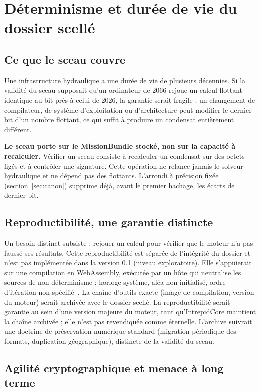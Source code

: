 \documentclass[11pt,a4paper]{article}
\begin{document}
\section{Déterminisme et durée de vie du dossier scellé}\label{sec:determinisme}

\subsection{Ce que le sceau couvre}

Une infrastructure hydraulique a une durée de vie de plusieurs décennies. Si la validité du sceau supposait qu'un ordinateur de 2066 rejoue un calcul flottant identique au bit près à celui de 2026, la garantie serait fragile : un changement de compilateur, de système d'exploitation ou d'architecture peut modifier le dernier bit d'un nombre flottant, ce qui suffit à produire un condensat entièrement différent.

\textbf{Le sceau porte sur le MissionBundle stocké, non sur la capacité à recalculer.} Vérifier un sceau consiste à recalculer un condensat sur des octets figés et à contrôler une signature. Cette opération ne relance jamais le solveur hydraulique et ne dépend pas des flottants. L'arrondi à précision fixée (section~\ref{sec:canon}) supprime déjà, avant le premier hachage, les écarts de dernier bit.

\subsection{Reproductibilité, une garantie distincte}

Un besoin distinct subsiste : rejouer un calcul pour vérifier que le moteur n'a pas faussé ses résultats. Cette reproductibilité est séparée de l'intégrité du dossier et n'est pas implémentée dans la version 0.1 (niveau exploratoire). Elle s'appuierait sur une compilation en WebAssembly, exécutée par un hôte qui neutralise les sources de non-déterminisme : horloge système, aléa non initialisé, ordre d'itération non spécifié~\cite{wasi}. La chaîne d'outils exacte (image de compilation, version du moteur) serait archivée avec le dossier scellé. La reproductibilité serait garantie au sein d'une version majeure du moteur, tant qu'IntrepidCore maintient la chaîne archivée ; elle n'est pas revendiquée comme éternelle. L'archive suivrait une doctrine de préservation numérique standard (migration périodique des formats, duplication géographique), distincte de la validité du sceau.

\subsection{Agilité cryptographique et menace à long terme}\label{sec:pq}
\end{document}
